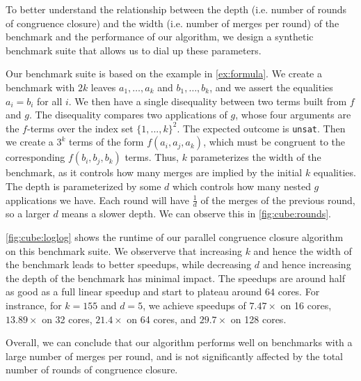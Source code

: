To better understand the relationship between the depth (i.e. number of rounds of congruence closure)
and the width (i.e. number of merges per round) of the benchmark and the performance of our algorithm, we design a synthetic benchmark suite that allows us to dial up these parameters.

Our benchmark suite is based on the example in \autoref{ex:formula}. We create a benchmark with $2k$ leaves $a_1, \ldots, a_k$ and $b_1, \ldots, b_k$, and we assert the equalities $a_i = b_i$ for all $i$. We then have a single disequality between two terms built from $f$ and $g$. The disequality compares two applications of $g$, whose four arguments are the $f$-terms over the index set $\{1, ..., k\}^2$. The expected outcome is \texttt{unsat}. Then we create a $3^k$ terms of the form $f(a_i, a_j, a_k)$, which must be congruent to the corresponding $f(b_i, b_j, b_k)$ terms. Thus, $k$ parameterizes the width of the benchmark, as it controls how many merges are implied by the initial $k$ equalities. The depth is parameterized by some $d$ which controls how many nested $g$ applications we have. Each round will have $\frac1d$ of the merges of the previous round, so a larger
$d$ means a slower depth. We can observe this in \autoref{fig:cube:rounds}.

\autoref{fig:cube:loglog} shows the runtime of our parallel congruence closure
algorithm on this benchmark suite. We observerve that increasing $k$ and hence
the width of the benchmark leads to better speedups, while decreasing $d$ and
hence increasing the depth of the benchmark has minimal impact. The speedups are
around half as good as a full linear speedup and start to plateau around $64$
cores. For instrance, for $k=155$ and $d=5$, we achieve speedups of $7.47\times$
on 16 cores, $13.89\times$ on 32 cores, $21.4\times$ on 64 cores, and
$29.7\times$ on 128 cores.

Overall, we can conclude that our algorithm performs well on benchmarks with a
large number of merges per round, and is not significantly affected by the total
number of rounds of congruence closure.



